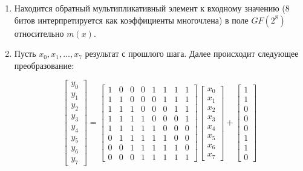 \documentclass[colorthm]{./civarticle}
\begin{document}
\begin{enumerate}
    \item Находится обратный мультипликативный элемент к входному значению (8 битов интерпретируется как коэффициенты многочлена) в поле $GF(2^8)$ относительно $m(x)$.
    \item Пусть $x_0, x_1, \dots, x_7$ результат с прошлого шага. Далее происходит следующее преобразование: 

    \begin{equation}
        \left[\begin{array}{l}
y_0 \\
y_1 \\
y_2 \\
y_3 \\
y_4 \\
y_5 \\
y_6 \\
y_7
\end{array}\right]=\left[\begin{array}{llllllll}
1 & 0 & 0 & 0 & 1 & 1 & 1 & 1 \\
1 & 1 & 0 & 0 & 0 & 1 & 1 & 1 \\
1 & 1 & 1 & 0 & 0 & 0 & 1 & 1 \\
1 & 1 & 1 & 1 & 0 & 0 & 0 & 1 \\
1 & 1 & 1 & 1 & 1 & 0 & 0 & 0 \\
0 & 1 & 1 & 1 & 1 & 1 & 0 & 0 \\
0 & 0 & 1 & 1 & 1 & 1 & 1 & 0 \\
0 & 0 & 0 & 1 & 1 & 1 & 1 & 1
\end{array}\right]\left[\begin{array}{l}
x_0 \\
x_1 \\
x_2 \\
x_3 \\
x_4 \\
x_5 \\
x_6 \\
x_7
\end{array}\right]+\left[\begin{array}{l}
1 \\
1 \\
0 \\
0 \\
0 \\
1 \\
1 \\
0
\end{array}\right]
    \end{equation}
\end{enumerate}
\end{document}
